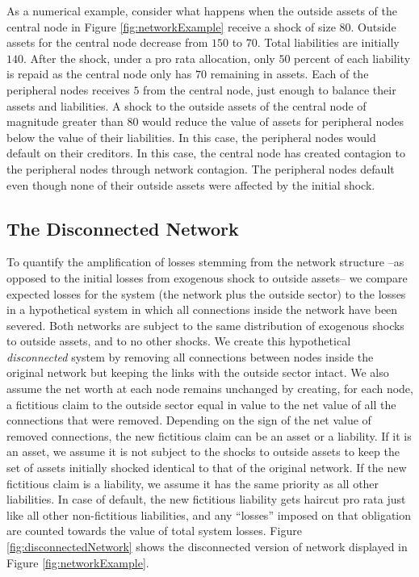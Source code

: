 As a numerical example, consider what happens when the outside assets of the central node in Figure \ref{fig:networkExample} receive a shock of size $80$. Outside assets for the central node decrease from $150$ to $70$. Total liabilities are initially $140$. After the shock, under a pro rata allocation, only $50$ percent of each liability is repaid as the central node only has $70$ remaining in assets. Each of the peripheral nodes receives $5$ from the central node, just enough to balance their assets and liabilities. A shock to the outside assets of the central node of magnitude greater than $80$ would reduce the value of assets for peripheral nodes below the value of their liabilities. In this case, the peripheral nodes would default on their creditors. In this case, the central node has created contagion to the peripheral nodes through network contagion. The peripheral nodes default even though none of their outside assets were affected by the initial shock.

\subsection{The Disconnected Network}

To quantify the amplification of losses stemming from the network structure --as opposed to the initial losses from exogenous shock to outside assets-- we compare expected losses for the system (the network plus the outside sector) to the losses in a hypothetical system in which all connections inside the network have been severed. Both networks are subject to the same distribution of exogenous shocks to outside assets, and to no other shocks. We create this hypothetical \textit{disconnected} system by removing all connections between nodes inside the original network but keeping the links with the outside sector intact. We also assume the net worth at each node remains unchanged by creating, for each node, a fictitious claim to the outside sector equal in value to the net value of all the connections that were removed. Depending on the sign of the net value of removed connections, the new fictitious claim can be an asset or a liability. If it is an asset, we assume it is not subject to the shocks to outside assets to keep the set of assets initially shocked identical to that of the original network. If the new fictitious claim is a liability, we assume it has the same priority as all other liabilities. In case of default, the new fictitious liability gets haircut pro rata just like all other non-fictitious liabilities, and any ``losses'' imposed on that obligation are counted towards the value of total system losses. Figure \ref{fig:disconnectedNetwork} shows the disconnected version of network displayed in Figure \ref{fig:networkExample}.

